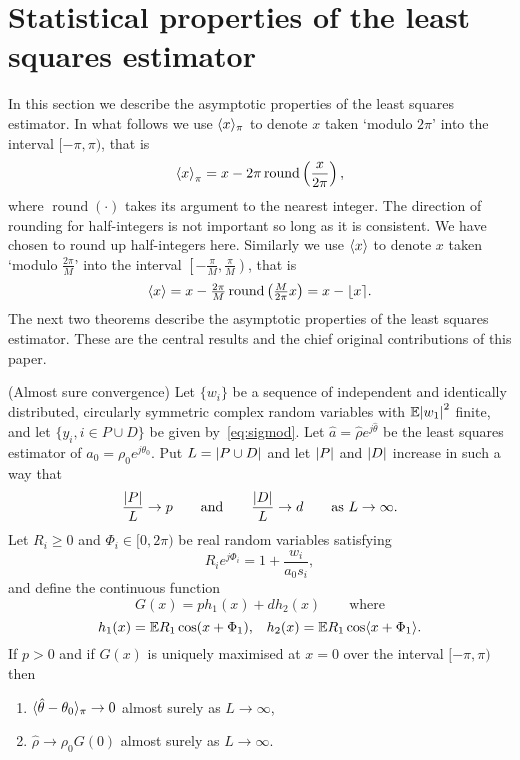 \documentclass[draftcls, onecolumn, 11pt]{IEEEtran}
\begin{document}
\section{Statistical properties of the least squares estimator}\label{sec:stat-prop-least}

In this section we describe the asymptotic properties of the least squares estimator.  In what follows we use $\langle x \rangle_\pi$ to denote $x$ taken `modulo $2\pi$' into the interval $[-\pi, \pi)$, that is
\[
\left\langle x \right\rangle_\pi = x - 2\pi\operatorname{round}\left(\frac{x}{2\pi}\right),
\]
where $\operatorname{round}(\cdot)$ takes its argument to the nearest integer.  The direction of rounding for half-integers is not important so long as it is consistent.  We have chosen to round up half-integers here.  Similarly we use $\langle x \rangle$ to denote $x$ taken `modulo $\tfrac{2\pi}{M}$' into the interval $\left[-\tfrac{\pi}{M}, \tfrac{\pi}{M}\right)$, that is
\[
\left\langle x \right\rangle = x - \tfrac{2\pi}{M}\operatorname{round}\left(\tfrac{M}{2\pi}x\right) = x - {\left\lfloor x \right\rceil}.
\]
The next two theorems describe the asymptotic properties of the least squares estimator.  These are the central results and the chief original contributions of this paper.

\begin{theorem}\label{thm:consistency} (Almost sure convergence)
Let $\{w_i\}$ be a sequence of independent and identically distributed, circularly symmetric complex random variables with ${\mathbb E} {\left\vert w_1 \right\vert}^2$ finite, and let $\{y_i, i \in P \cup D\}$ be given by~\eqref{eq:sigmod}.   Let $\hat{a} = \hat{\rho}e^{j\hat{\theta}}$ be the least squares estimator of $a_0 = \rho_0e^{j\theta_0}$. %
Put $L = {\left\vert P \cup D \right\vert}$ and let ${\left\vert P \right\vert}$ and ${\left\vert D \right\vert}$ increase in such a way that
\[
\frac{{\left\vert P \right\vert}}{L} \rightarrow p \qquad \text{and} \qquad \frac{{\left\vert D \right\vert}}{L} \rightarrow d \qquad \text{as $L \rightarrow \infty$.}
\] 
Let $R_i \geq 0$ and $\Phi_i \in [0,2\pi)$ be real random variables satisfying
\begin{equation}\label{eq:RiandPhii}
R_ie^{j\Phi_i} = 1 + \frac{w_i}{a_0 s_i} ,
\end{equation}
and define the continuous function
\[
G(x) = p h_1(x) + d h_2(x) \qquad \text{where}
\]
\[
h_1(x) = {\mathbb E} R_1 \cos(x + \Phi_1), \;\;\; h_2(x) =  {\mathbb E} R_1 \cos\langle  x + \Phi_1 \rangle.
\]
If $p > 0$ and if $G(x)$ is uniquely maximised at $x = 0$ over the interval $[-\pi,\pi)$ then
\begin{enumerate}
\item $\langle \hat{\theta} - \theta_0 \rangle_\pi \rightarrow 0$ almost surely as $L \rightarrow \infty$,
\item $\hat{\rho} \rightarrow \rho_0 G(0)$ almost surely as $L \rightarrow \infty$.
\end{enumerate}
\end{theorem}
\end{document}
